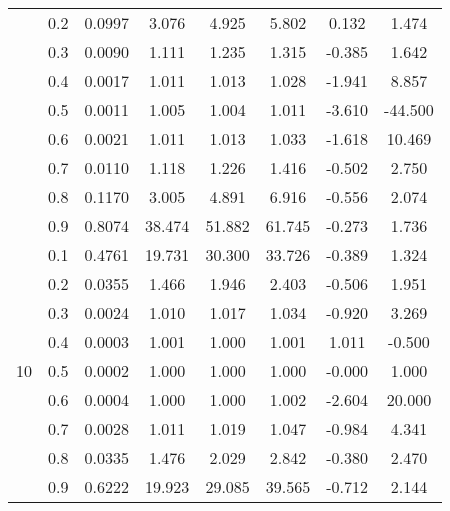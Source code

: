 \documentclass[11pt,a4paper]{report}
\begin{document}
\begin{longtable}{ | c | c || c | c | c | c | c | c | }
 & 0.2 & 0.0997 & 3.076 & 4.925 & 5.802 & 0.132 & 1.474 \\
 & 0.3 & 0.0090 & 1.111 & 1.235 & 1.315 & -0.385 & 1.642 \\
 & 0.4 & 0.0017 & 1.011 & 1.013 & 1.028 & -1.941 & 8.857 \\
 & 0.5 & 0.0011 & 1.005 & 1.004 & 1.011 & -3.610 & -44.500 \\
 & 0.6 & 0.0021 & 1.011 & 1.013 & 1.033 & -1.618 & 10.469 \\
 & 0.7 & 0.0110 & 1.118 & 1.226 & 1.416 & -0.502 & 2.750 \\
 & 0.8 & 0.1170 & 3.005 & 4.891 & 6.916 & -0.556 & 2.074 \\
 & 0.9 & 0.8074 & 38.474 & 51.882 & 61.745 & -0.273 & 1.736 \\
 \hline
\multirow{9}{*}{10} & 0.1 & 0.4761 & 19.731 & 30.300 & 33.726 & -0.389 & 1.324 \\
 & 0.2 & 0.0355 & 1.466 & 1.946 & 2.403 & -0.506 & 1.951 \\
 & 0.3 & 0.0024 & 1.010 & 1.017 & 1.034 & -0.920 & 3.269 \\
 & 0.4 & 0.0003 & 1.001 & 1.000 & 1.001 & 1.011 & -0.500 \\
 & 0.5 & 0.0002 & 1.000 & 1.000 & 1.000 & -0.000 & 1.000 \\
 & 0.6 & 0.0004 & 1.000 & 1.000 & 1.002 & -2.604 & 20.000 \\
 & 0.7 & 0.0028 & 1.011 & 1.019 & 1.047 & -0.984 & 4.341 \\
 & 0.8 & 0.0335 & 1.476 & 2.029 & 2.842 & -0.380 & 2.470 \\
 & 0.9 & 0.6222 & 19.923 & 29.085 & 39.565 & -0.712 & 2.144 \\
 \hline
\hline
\end{longtable}
\end{document}
